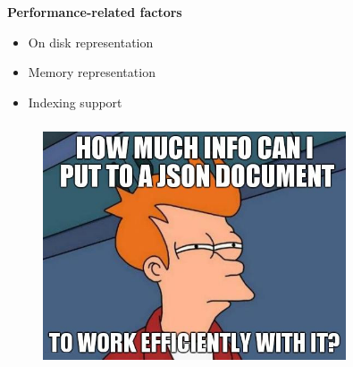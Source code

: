 \documentclass[usenames,dvipsnames, 18pt, compress, aspectratio=169]{beamer}
\begin{document}
\begin{frame}
    \frametitle{}
    \begin{center}
        \textbf{Performance-related factors}
        \pause
        \begin{itemize}[label={\MVRightarrow}]
            \item <+-> On disk representation
            \item <+-> Memory representation
            \item <+-> Indexing support
        \end{itemize}
    \end{center}
\end{frame}

\fontsize{17pt}{19}\selectfont
\begin{frame}
    \frametitle{}
    \begin{center}

    \begin{figure}
        \includegraphics[width=0.8\textwidth,center]{fry_disk_json.jpg}
    \end{figure}

    \end{center}
\end{frame}
\end{document}
